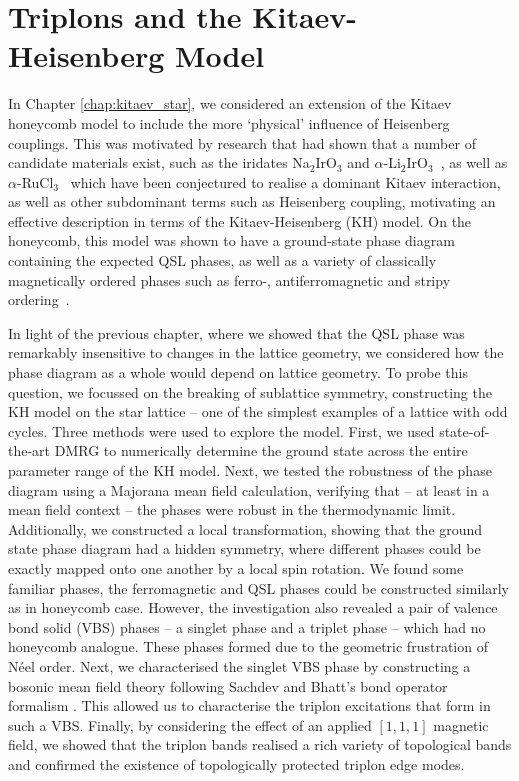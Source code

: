 \section{Triplons and the Kitaev-Heisenberg Model}

In Chapter \ref{chap:kitaev_star}, we considered an extension of the Kitaev honeycomb model to include the more `physical' influence of Heisenberg couplings. This was motivated by research that had shown that a number of candidate materials exist, such as the iridates Na$_2$IrO$_3$ and $\alpha$-Li$_2$IrO$_3$~\cite{singh_antiferromagnetic_2010, singh_relevance_2012,revelli_fingerprints_2020}, as well as $\alpha$-RuCl$_3$~\cite{sandilands_scattering_2015,banerjee_proximate_2016} which have been conjectured to realise a dominant Kitaev interaction, as well as other subdominant terms such as Heisenberg coupling, motivating an effective description in terms of the Kitaev-Heisenberg (KH) model. On the honeycomb, this model was shown to have a ground-state phase diagram containing the expected QSL phases, as well as a variety of classically magnetically ordered phases such as ferro-, antiferromagnetic and stripy ordering~\cite{chaloupka_zigzag_2013,rau_spin-orbit_2016, gohlke_dynamics_2017}. 

In light of the previous chapter, where we showed that the QSL phase was remarkably insensitive to changes in the lattice geometry, we considered how the phase diagram as a whole would depend on lattice geometry. To probe this question, we focussed on the breaking of sublattice symmetry, constructing the KH model on the star lattice -- one of the simplest examples of a lattice with odd cycles. Three methods were used to explore the model. First, we used state-of-the-art DMRG \cite{tenpy} to numerically determine the ground state across the entire parameter range of the KH model. Next, we tested the robustness of the phase diagram using a Majorana mean field calculation, verifying that -- at least in a mean field context -- the phases were robust in the thermodynamic limit. Additionally, we constructed a local transformation, showing that the ground state phase diagram had a hidden symmetry, where different phases could be exactly mapped onto one another by a local spin rotation. We found some familiar phases, the ferromagnetic and QSL phases could be constructed similarly as in honeycomb case. However, the investigation also revealed a pair of valence bond solid (VBS) phases -- a singlet phase and a triplet phase -- which had no honeycomb analogue. These phases formed due to the geometric frustration of N\'eel order. Next, we characterised the singlet VBS phase by constructing a bosonic mean field theory following Sachdev and Bhatt's bond operator formalism \cite{sachdev_bond-operator_1990}. This allowed us to characterise the triplon excitations that form in such a VBS. Finally, by considering the effect of an applied $[1,1,1]$ magnetic field, we showed that the triplon bands realised a rich variety of topological bands and confirmed the existence of topologically protected triplon edge modes. 

